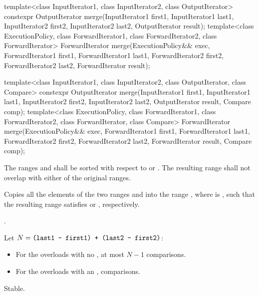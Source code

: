 %
\begin{itemdecl}
template<class InputIterator1, class InputIterator2,
         class OutputIterator>
  constexpr OutputIterator
    merge(InputIterator1 first1, InputIterator1 last1,
          InputIterator2 first2, InputIterator2 last2,
          OutputIterator result);
template<class ExecutionPolicy, class ForwardIterator1, class ForwardIterator2,
         class ForwardIterator>
  ForwardIterator
    merge(ExecutionPolicy&& exec,
          ForwardIterator1 first1, ForwardIterator1 last1,
          ForwardIterator2 first2, ForwardIterator2 last2,
          ForwardIterator result);

template<class InputIterator1, class InputIterator2,
         class OutputIterator, class Compare>
  constexpr OutputIterator
    merge(InputIterator1 first1, InputIterator1 last1,
          InputIterator2 first2, InputIterator2 last2,
          OutputIterator result, Compare comp);
template<class ExecutionPolicy, class ForwardIterator1, class ForwardIterator2,
         class ForwardIterator, class Compare>
  ForwardIterator
    merge(ExecutionPolicy&& exec,
          ForwardIterator1 first1, ForwardIterator1 last1,
          ForwardIterator2 first2, ForwardIterator2 last2,
          ForwardIterator result, Compare comp);
\end{itemdecl}

\begin{itemdescr}
\pnum
\requires The ranges  and  shall be
sorted with respect to  or .
The resulting range shall not overlap with either of the original ranges.

\pnum
\effects Copies all the elements of the two ranges  and
 into the range , where 
is , such that the resulting range satisfies
 or , respectively.

\pnum
\returns
{}.

\pnum
\complexity Let $N = \texttt{(last1 - first1) + (last2 - first2)}$:
\begin{itemize}
\item For the overloads with no , at most $N - 1$ comparisons.
\item For the overloads with an ,  comparisons.
\end{itemize}

\pnum
\remarks Stable.
\end{itemdescr}

